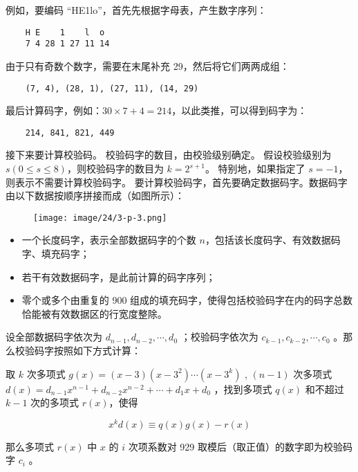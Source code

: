 例如，要编码 “HE1lo”，首先先根据字母表，产生数字序列：

\begin{lstlisting}
    H E    1    l  o
    7 4 28 1 27 11 14
\end{lstlisting}

由于只有奇数个数字，需要在末尾补充 29，然后将它们两两成组：

\begin{lstlisting}
    (7, 4), (28, 1), (27, 11), (14, 29)
\end{lstlisting}

最后计算码字，例如：$30\times 7+4=214$，以此类推，可以得到码字为：

\begin{lstlisting}
    214, 841, 821, 449
\end{lstlisting}

接下来要计算校验码。
校验码字的数目，由校验级别确定。
假设校验级别为 $s(0\le s\le 8)$，则校验码字的数目为 $k=2^{s+1}$。
特别地，如果指定了 $s=-1$，则表示不需要计算校验码字。
要计算校验码字，首先要确定数据码字。数据码字由以下数据按顺序拼接而成（如图所示）：

\begin{figure}[H]
    \centering
    \texttt{[image: image/24/3-p-3.png]}
\end{figure}

\begin{itemize}
    \item 一个长度码字，表示全部数据码字的个数 $n$，包括该长度码字、有效数据码字、填充码字；
    \item 若干有效数据码字，是此前计算的码字序列；
    \item 零个或多个由重复的 900 组成的填充码字，使得包括校验码字在内的码字总数恰能被有效数据区的行宽度整除。
\end{itemize}

设全部数据码字依次为 $d_{n-1},d_{n-2},\cdots,d_0$
；校验码字依次为 $c_{k-1},c_{k-2},\cdots,c_0$
。那么校验码字按照如下方式计算：

取 $k$ 次多项式 $g(x)=(x-3)(x-3^2)\cdots(x-3^k)$
, $(n-1)$ 次多项式 $d(x)=d_{n-1}x^{n-1}+d_{n-2}x^{n-2}+\cdots+d_1x+d_0$
，找到多项式 $q(x)$ 和不超过 $k-1$ 次的多项式 $r(x)$，使得

\begin{equation*}
    x^kd(x)\equiv q(x)g(x)-r(x)
\end{equation*}

那么多项式 $r(x)$ 中 $x$ 的 $i$ 次项系数对 929 取模后（取正值）的数字即为校验码字 $c_i$
。

